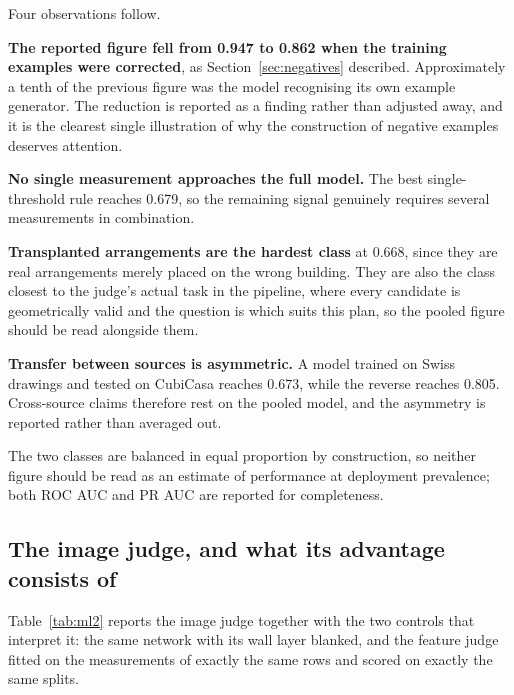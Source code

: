 Four observations follow.

\textbf{The reported figure fell from 0.947 to 0.862 when the training
examples were corrected}, as Section~\ref{sec:negatives} described.
Approximately a tenth of the previous figure was the model recognising its
own example generator. The reduction is reported as a finding rather than
adjusted away, and it is the clearest single illustration of why the
construction of negative examples deserves attention.

\textbf{No single measurement approaches the full model.} The best
single-threshold rule reaches 0.679, so the remaining signal genuinely
requires several measurements in combination.

\textbf{Transplanted arrangements are the hardest class} at 0.668, since
they are real arrangements merely placed on the wrong building. They are
also the class closest to the judge's actual task in the pipeline, where
every candidate is geometrically valid and the question is which suits
this plan, so the pooled figure should be read alongside them.

\textbf{Transfer between sources is asymmetric.} A model trained on Swiss
drawings and tested on CubiCasa reaches 0.673, while the reverse reaches
0.805. Cross-source claims therefore rest on the pooled model, and the
asymmetry is reported rather than averaged out.

The two classes are balanced in equal proportion by construction, so
neither figure should be read as an estimate of performance at deployment
prevalence; both ROC AUC and PR AUC are reported for completeness.

\subsection{The image judge, and what its advantage consists of}

Table~\ref{tab:ml2} reports the image judge together with the two controls
that interpret it: the same network with its wall layer blanked, and the
feature judge fitted on the measurements of exactly the same rows and
scored on exactly the same splits.

\begin{table}[H]
\centering
\caption[The image judge and its controls]{The image judge and its
controls, over three grouped splits. The feature judge here is
\emph{paired}: fitted on the measurements of the same rows and scored on
the same split indices, which removes the confound present in an earlier
version of this comparison.}
\label{tab:ml2}
\small

\end{table}

